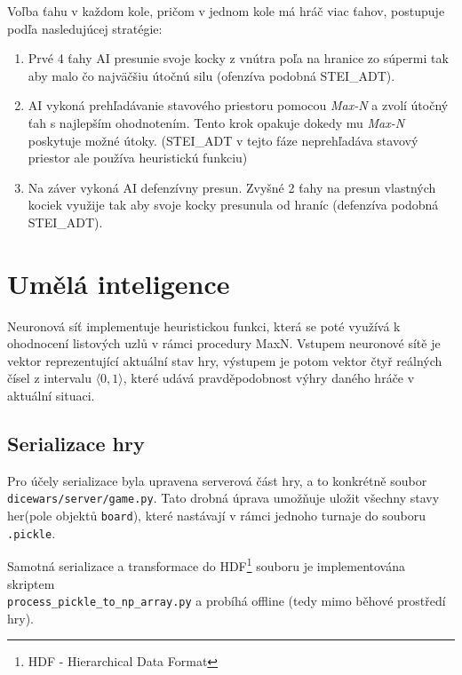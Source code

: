 \documentclass[a4paper, 11pt]{article}
\begin{document}
Voľba ťahu v každom kole, pričom v jednom kole má hráč viac ťahov, postupuje podľa nasledujúcej stratégie:
\begin{enumerate}
	\item Prvé 4 ťahy AI presunie svoje kocky z vnútra poľa na hranice zo súpermi tak aby malo čo najväčšiu útočnú silu (ofenzíva podobná STEI\_ADT).
	\item AI vykoná prehľadávanie stavového priestoru pomocou \textit{Max-N} a zvolí útočný ťah s najlepším ohodnotením. Tento krok opakuje dokedy mu \textit{Max-N} poskytuje možné útoky. (STEI\_ADT v tejto fáze neprehľadáva stavový priestor ale používa heuristickú funkciu)
	\item Na záver vykoná AI defenzívny presun. Zvyšné 2 ťahy na presun vlastných kociek využije tak aby svoje kocky presunula od hraníc (defenzíva podobná STEI\_ADT).
\end{enumerate}

\section{Umělá inteligence}

Neuronová síť implementuje heuristickou funkci, která se poté využívá k ohodnocení listových uzlů v rámci procedury MaxN. Vstupem neuronové sítě je vektor reprezentující aktuální stav hry, výstupem je potom vektor čtyř reálných čísel z intervalu $\langle 0,1 \rangle$, které udává pravděpodobnost výhry daného hráče v aktuální situaci.


\subsection{Serializace hry}
Pro účely serializace byla upravena serverová část hry, a to konkrétně soubor \texttt{dicewars/server/game.py}. Tato drobná úprava umožňuje uložit všechny stavy her(pole objektů \texttt{board}), které nastávají v rámci jednoho turnaje do souboru \texttt{.pickle}.

Samotná serializace a transformace do HDF\footnote{HDF - Hierarchical Data Format} souboru je implementována skriptem\\\texttt{process\_pickle\_to\_np\_array.py} a probíhá offline (tedy mimo běhové prostředí hry).
\end{document}
